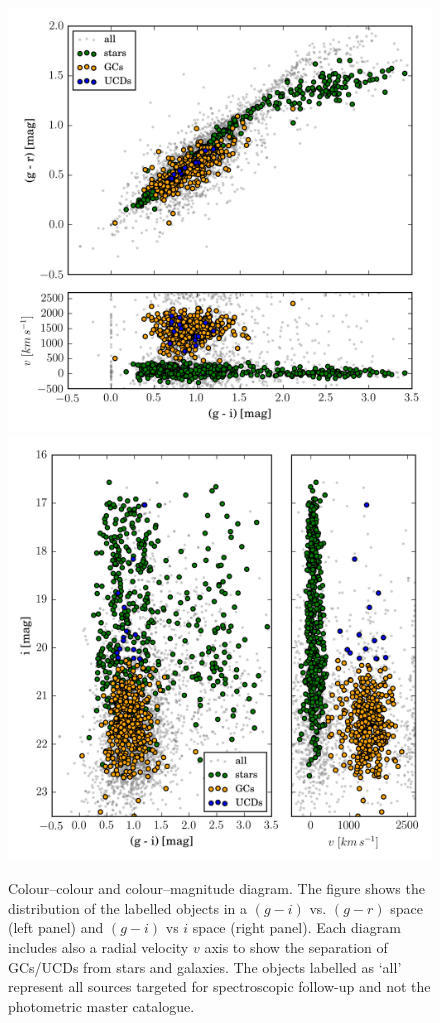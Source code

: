 \documentclass[useAMS,usenatbib]{mn2e}
\begin{document}
\begin{figure}
\centering
\includegraphics[width=\columnwidth]{figures/cc.png} 
\includegraphics[width=\columnwidth]{figures/cm.png} 
\caption{Colour--colour and colour--magnitude diagram. The figure shows the 
distribution of the labelled objects in a $(g-i)$ vs. $(g-r)$ space (left 
panel) and $(g-i)$ vs $i$ space (right panel). Each diagram includes also a 
radial velocity $v$ axis to show the separation of GCs/UCDs from stars and 
galaxies. The objects labelled as `all' represent all sources targeted for 
spectroscopic follow-up and not the photometric master catalogue.}
\label{fig:cc}
\end{figure}
\end{document}

